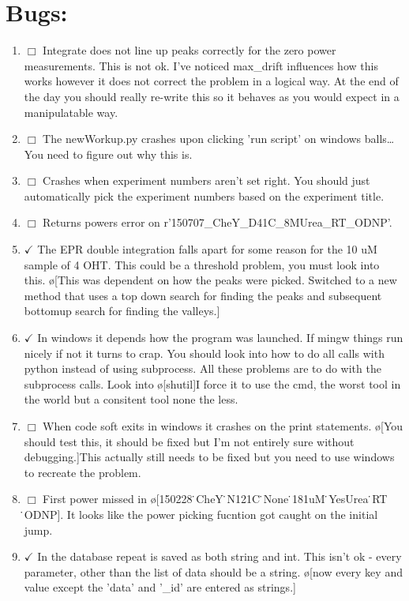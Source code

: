 \documentclass[10pt]{book}
\begin{document}
\section{Bugs:}
\begin{enumerate}
    \item $\Box$ Integrate does not line up peaks correctly for the zero power measurements. This is not ok. I've noticed max_drift influences how this works however it does not correct the problem in a logical way. At the end of the day you should really re-write this so it behaves as you would expect in a manipulatable way.
    \item $\Box$ The newWorkup.py crashes upon clicking 'run script' on windows balls\ldots You need to figure out why this is.
    \item $\Box$ Crashes when experiment numbers aren't set right. You should just automatically pick the experiment numbers based on the experiment title.
    \item $\Box$ Returns powers error on r'150707_CheY_D41C_8MUrea_RT_ODNP'.
    \item $\checkmark$ The EPR double integration falls apart for some reason for the 10 uM sample of 4 OHT. This could be a threshold problem, you must look into this. \o[This was dependent on how the peaks were picked. Switched to a new method that uses a top down search for finding the peaks and subsequent bottomup search for finding the valleys.]{}
    \item $\checkmark$ In windows it depends how the program was launched. If mingw things run nicely if not it turns to crap. You should look into how to do all calls with python instead of using subprocess. All these problems are to do with the subprocess calls. Look into \o[shutil]{I force it to use the cmd, the worst tool in the world but a consitent tool none the less.}
    \item $\Box$ When code soft exits in windows it crashes on the print statements. \o[You should test this, it should be fixed but I'm not entirely sure without debugging.]{This actually still needs to be fixed but you need to use windows to recreate the problem.}
    \item $\Box$ First power missed in \o[150228 ̇CheY ̇N121C ̇None ̇181uM ̇YesUrea ̇RT ̇ODNP]{}. It looks like the power picking fucntion got caught on the initial jump.
    \item $\checkmark$ In the database repeat is saved as both string and int. This isn't ok - every parameter, other than the list of data should be a string. \o[now every key and value except the 'data' and '\_id' are entered as strings.]{}

\end{enumerate}
\end{document}
